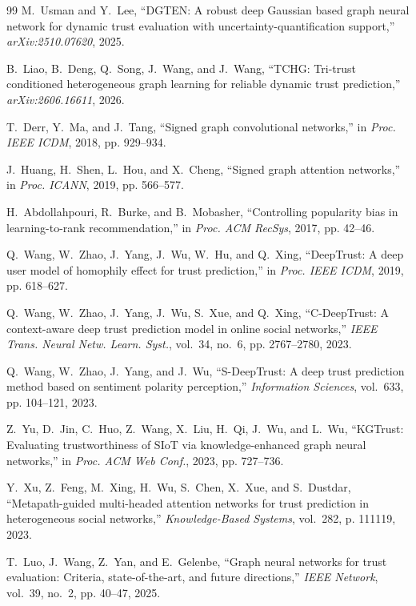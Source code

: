 \documentclass[conference]{IEEEtran}
\begin{document}
\begin{thebibliography}{99}
M.~Usman and Y.~Lee, ``DGTEN: A robust deep Gaussian based graph neural network for dynamic trust evaluation with uncertainty-quantification support,'' \emph{arXiv:2510.07620}, 2025.

B.~Liao, B.~Deng, Q.~Song, J.~Wang, and J.~Wang, ``TCHG: Tri-trust conditioned heterogeneous graph learning for reliable dynamic trust prediction,'' \emph{arXiv:2606.16611}, 2026.

T.~Derr, Y.~Ma, and J.~Tang, ``Signed graph convolutional networks,'' in \emph{Proc. IEEE ICDM}, 2018, pp. 929--934.

J.~Huang, H.~Shen, L.~Hou, and X.~Cheng, ``Signed graph attention networks,'' in \emph{Proc. ICANN}, 2019, pp. 566--577.

H.~Abdollahpouri, R.~Burke, and B.~Mobasher, ``Controlling popularity bias in learning-to-rank recommendation,'' in \emph{Proc. ACM RecSys}, 2017, pp. 42--46.

Q.~Wang, W.~Zhao, J.~Yang, J.~Wu, W.~Hu, and Q.~Xing, ``DeepTrust: A deep user model of homophily effect for trust prediction,'' in \emph{Proc. IEEE ICDM}, 2019, pp. 618--627.

Q.~Wang, W.~Zhao, J.~Yang, J.~Wu, S.~Xue, and Q.~Xing, ``C-DeepTrust: A context-aware deep trust prediction model in online social networks,'' \emph{IEEE Trans. Neural Netw. Learn. Syst.}, vol.~34, no.~6, pp. 2767--2780, 2023.

Q.~Wang, W.~Zhao, J.~Yang, and J.~Wu, ``S-DeepTrust: A deep trust prediction method based on sentiment polarity perception,'' \emph{Information Sciences}, vol.~633, pp. 104--121, 2023.

Z.~Yu, D.~Jin, C.~Huo, Z.~Wang, X.~Liu, H.~Qi, J.~Wu, and L.~Wu, ``KGTrust: Evaluating trustworthiness of SIoT via knowledge-enhanced graph neural networks,'' in \emph{Proc. ACM Web Conf.}, 2023, pp. 727--736.

Y.~Xu, Z.~Feng, M.~Xing, H.~Wu, S.~Chen, X.~Xue, and S.~Dustdar, ``Metapath-guided multi-headed attention networks for trust prediction in heterogeneous social networks,'' \emph{Knowledge-Based Systems}, vol.~282, p. 111119, 2023.

T.~Luo, J.~Wang, Z.~Yan, and E.~Gelenbe, ``Graph neural networks for trust evaluation: Criteria, state-of-the-art, and future directions,'' \emph{IEEE Network}, vol.~39, no.~2, pp. 40--47, 2025.


\end{thebibliography}
\end{document}
